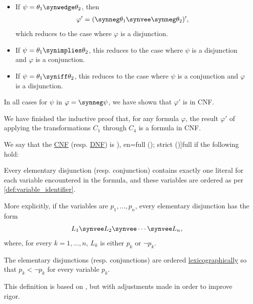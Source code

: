 \begin{defproof}
\begin{itemize}
\begin{itemize}
      This reduces to the case where \( \varphi' \) is a conjunction.

      \item If \( \psi = \theta_1 \synwedge \theta_2 \), then
      \begin{align*}
        \varphi'
        =
        (\synneg \theta_1 \synvee \synneg \theta_2)',
      \end{align*}
      which reduces to the case where \( \varphi \) is a disjunction.

      \item If \( \psi = \theta_1 \synimplies \theta_2 \), this reduces to the case where \( \psi \) is a disjunction and \( \varphi \) is a conjunction.
      \item If \( \psi = \theta_1 \syniff \theta_2 \), this reduces to the case where \( \psi \) is a conjunction and \( \varphi \) is a disjunction.
    \end{itemize}

    In all cases for \( \psi \) in \( \varphi = \synneg \psi \), we have shown that \( \varphi' \) is in CNF.
  \end{itemize}

  We have finished the inductive proof that, for any formula \( \varphi \), the result \( \varphi' \) of applying the transformations \( C_1 \) through \( C_4 \) is a formula in CNF.
\end{defproof}

\begin{definition}\label{def:full_cnf_and_dnf}\mimprovised
  We say that the \hyperref[def:cnf_and_dnf]{CNF} (resp. \hyperref[def:cnf_and_dnf]{DNF}) is \term[ru=совершенная (\cite[def. 6.3; def. 6.4]{Эдельман1975Логика}), en=full (); strict (\cite[def. 1.3.10]{Hinman2005Logic})]{full} if the following hold:
  \begin{thmenum}
     Every elementary disjunction (resp. conjunction) contains exactly one literal for each variable encountered in the formula, and these variables are ordered as per \cref{def:variable_identifier}.

    More explicitly, if the variables are \( p_1, \ldots, p_n \), every elementary disjunction has the form
    \begin{equation*}
      L_1 \synvee L_2 \synvee \cdots \synvee L_n,
    \end{equation*}
    where, for every \( k = 1, \ldots, n \), \( L_k \) is either \( p_k \) or \( \neg p_k \).

     The elementary disjunctions (resp. conjunctions) are ordered \hyperref[def:lexicographic_order]{lexicographically} so that \( p_k < \neg p_k \) for every variable \( p_k \).
  \end{thmenum}
\end{definition}
\begin{comments}
  \item This definition is based on \cite[def. 6.3; def. 6.4]{Эдельман1975Логика}, but with adjustments made in order to improve rigor.
\end{comments}

